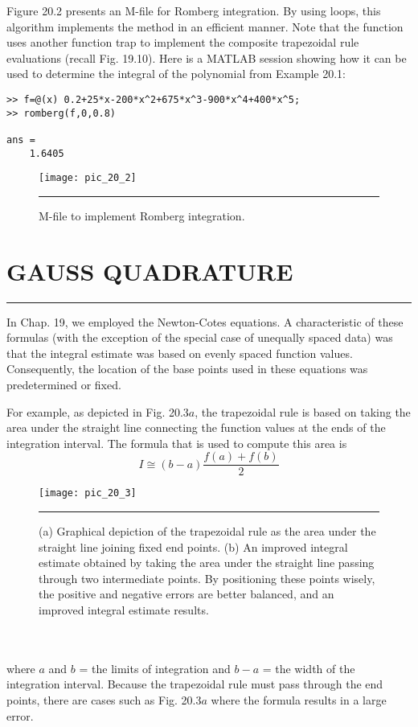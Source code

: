 \documentclass[../main.tex]{subfiles}
\begin{document}
Figure 20.2 presents an M-file for Romberg integration. By using loops, this algorithm
implements the method in an efficient manner. Note that the function uses another function
trap to implement the composite trapezoidal rule evaluations (recall Fig. 19.10). Here is
a MATLAB session showing how it can be used to determine the integral of the polynomial
from Example 20.1:

\begin{verbatim}
>> f=@(x) 0.2+25*x-200*x^2+675*x^3-900*x^4+400*x^5;
>> romberg(f,0,0.8)

ans =
    1.6405
\end{verbatim}

\begin{figure}[hbt!]
	\centering
	\texttt{[image: pic\_20\_2]}
	\caption{\textsf{M-file to implement Romberg integration.}} \hrule
	\label{pic.20.2}
\end{figure}

\vspace{0,3in}
\section{GAUSS QUADRATURE}
\vspace{0,1in}
\hrule
\vspace{0,1in}
In Chap. 19, we employed the Newton-Cotes equations. A characteristic of these formulas
(with the exception of the special case of unequally spaced data) was that the integral estimate was based on evenly spaced function values. Consequently, the location of the base
points used in these equations was predetermined or fixed.

For example, as depicted in Fig. 20.3$a$, the trapezoidal rule is based on taking the area
under the straight line connecting the function values at the ends of the integration interval.
The formula that is used to compute this area is
\begin{equation}
	\tag{20.10}
	I\cong (b-a)\dfrac{f(a)+f(b)}{2}
\end{equation}
\pagebreak
\begin{figure}[hbt!]
	\centering
	\texttt{[image: pic\_20\_3]}
	\caption{\textsf{(a) Graphical depiction of the trapezoidal rule as the area under the straight line joining fixed
end points. (b) An improved integral estimate obtained by taking the area under the straight line
passing through two intermediate points. By positioning these points wisely, the positive and 
negative errors are better balanced, and an improved integral estimate results.}} \hrule
	\label{pic.20.3}
\end{figure}\\
\vspace{0.1in}\\
where $a$ and $b$ = the limits of integration and $b − a$ = the width of the integration interval.
Because the trapezoidal rule must pass through the end points, there are cases such as
Fig. 20.3$a$ where the formula results in a large error.
\end{document}
